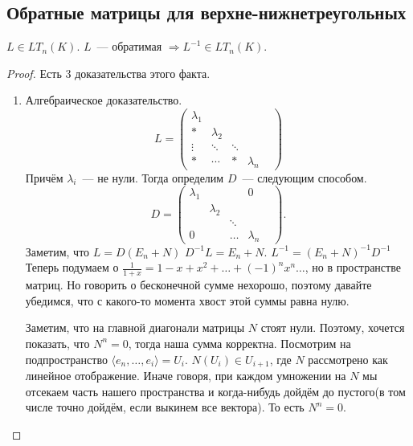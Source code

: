 \subsection{Обратные матрицы для верхне-нижнетреугольных}
\begin{statement}
     $L\in LT_n(K)$. $L$~--- обратимая $\Rightarrow L^{-1}\in LT_n(K)$.
\end{statement}
\begin{proof}
    Есть 3 доказательства этого факта.
    \begin{enumerate}
        \item Алгебраическое доказательство.\\
            $$L = 
            \begin{pmatrix}
                \lambda_1&&&\\
                *&\lambda_2&&\\
                \vdots&\ddots&\ddots&&\\
                *&\cdots&*&\lambda_n
            \end{pmatrix}$$
            Причём $\lambda_i$~--- не нули. Тогда определим $D$~--- следующим способом.
            \[
            D = \begin{pmatrix}
                \lambda_1&&&0\\
                &\lambda_2&&\\
                &&\ddots&&\\
                0&&\dots&\lambda_n
            \end{pmatrix}
            .\] 
            Заметим, что $L = D(E_n + N)$
            $D^{-1}L = E_n + N$. 
            $L^{-1} = (E_n + N)^{-1}D^{-1}$ 
            Теперь подумаем о $\frac{1}{1+x} = 1 - x + x^2 +\dots +(-1)^nx^n\dots$,
            но в пространстве матриц.
            Но говорить о бесконечной сумме нехорошо, поэтому давайте убедимся,
            что с какого-то момента хвост этой суммы равна нулю.

            Заметим, что на главной диагонали матрицы $N$ стоят нули. Поэтому, хочется
            показать, что $N^n = 0$, тогда наша сумма корректна.
            Посмотрим на подпространство $\langle e_n,\dots, e_i\rangle = U_i$.
            $N(U_i)\in U_{i+1}$, где $N$ рассмотрено как линейное отображение.
            Иначе говоря, при каждом умножении на $N$ мы отсекаем часть нашего пространства
            и когда-нибудь дойдём до пустого(в том числе точно дойдём, если выкинем все вектора).
            То есть $N^n = 0$. 


\end{enumerate}
\end{proof}
